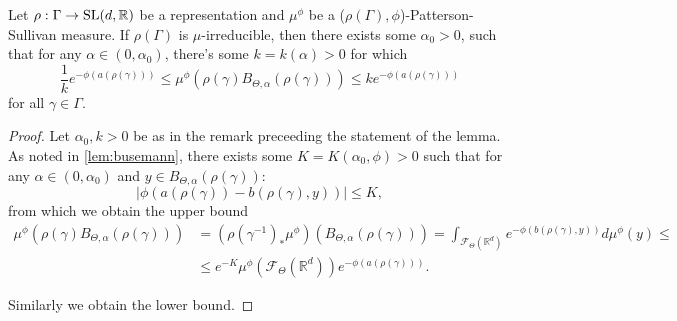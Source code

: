 \documentclass{report}
\begin{document}
\begin{lemma}\label{lem:PSMeasureBounds}
    Let $\rho:\Gamma \to \operatorname{{\mathrm{SL}}}(d, \mathbb R)$ be a representation and $\mu^\phi$ be a ($\rho(\Gamma), \phi$)-Patterson-Sullivan measure.
    If $\rho(\Gamma)$ is $\mu$-irreducible, then there exists some $\alpha_0 > 0$, such that for any $\alpha \in (0, \alpha_0)$, there's some $k = k(\alpha) > 0$ for which
    \[
        \frac{1}{k} e^{-\phi(a(\rho(\gamma)))} 
        \leq 
        \mu^\phi(\rho(\gamma) B_{\Theta, \alpha}(\rho(\gamma))) 
        \leq
        k e^{-\phi(a(\rho(\gamma)))} 
    \]
    for all $\gamma \in \Gamma$. 
\end{lemma}
\begin{proof}
    Let $\alpha_0, k > 0$ be as in the remark preceeding the statement of the lemma.
    As noted in \cref{lem:busemann}, there exists some $K = K(\alpha_0, \phi) > 0$ such that for any $\alpha \in (0, \alpha_0)$ and $y \in B_{\Theta, \alpha}(\rho(\gamma))$:
    \[
        |\phi(a(\rho(\gamma)) - b(\rho(\gamma), y))| \leq K,
    \]
    from which we obtain the upper bound
    \begin{align*}
        \mu^\phi(\rho(\gamma) B_{\Theta, \alpha}(\rho(\gamma))) &=
        (\rho(\gamma^{-1})_*\mu^\phi)(B_{\Theta, \alpha}(\rho(\gamma))) =
        \int_{\mathcal F_\Theta(\mathbb R^d)} e^{-\phi(b(\rho(\gamma), y))} d\mu^\phi(y)\leq\\
        &\leq
        e^{-K} \mu^\phi(\mathcal F_\Theta (\mathbb R^d)) e^{-\phi(a(\rho(\gamma)))}.
    \end{align*}
    
    Similarly we obtain the lower bound.
\end{proof}
\end{document}
